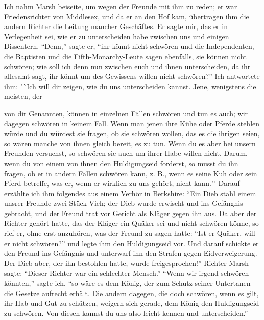 Ich nahm Marsh beiseite, um wegen der Freunde mit ihm
zu reden; er war Friedensrichter von Middlesex, und da er an den
Hof kam, übertragen ihm die andern Richter die Leitung mancher
Geschäftes. Er sagte mir, das er in Verlegenheit sei, wie er zu
unterscheiden habe zwischen uns und einigen Dissentern. "`Denn,"'
sagte er, "`ihr könnt nicht schwören und die Independenten, die
Baptisten und die Fifth-Monarchy-Leute sagen ebenfalls, sie können
nicht schwören; wie soll ich denn nun zwischen euch und ihnen 
unterscheiden, da ihr allesamt sagt, ihr könnt um des Gewissens willen
nicht schwören?"' 
Ich antwortete ihm: "`Ich will dir zeigen, wie
du uns unterscheiden kannst. Jene, wenigstens die meisten, der

von dir Genannten, können in einzelnen Fällen schwören und tun
es auch; wir dagegen schwören in keinem Fall. Wenn man jenen
ihre Kühe oder Pferde stehlen würde und du würdest sie fragen,
ob sie schwören wollen, das es die ihrigen seien, so wären manche
von ihnen gleich bereit, es zu tun. Wenn du es aber bei unsern
Freunden versuchst, so schwören sie auch um ihrer Habe willen
nicht. Darum, wenn du von einem von ihnen den Huldigungseid
forderst, so musst du ihn fragen, ob er in andern Fällen schwören
kann, z. B., wenn es seine Kuh oder sein Pferd betreffe, was er,
wenn er wirklich zu uns gehört, nicht kann."' Darauf erzählte
ich ihm folgendes aus einem Verhör in Berkshire: 
"`Ein Dieb stahl einem unsrer Freunde zwei Stück Vieh; der Dieb wurde erwischt
und ins Gefängnis gebracht, und der Freund trat vor Gericht
als Kläger gegen ihn aus. Da aber der Richter gehört hatte,
das der Kläger ein Quäker sei und nicht schwören könne, so rief
er, ohne erst anzuhören, was der Freund zu sagen hatte: "`Ist
er Quäker, will er nicht schwören?"' und legte ihm den Huldigungseid 
vor. Und darauf schickte er den Freund ins Gefängnis und unterwarf 
ihn den Strafen gegen Eidverweigerung. Der Dieb aber, der
ihn bestohlen hatte, wurde freigesprochen!"' Richter Marsh sagte:
"`Dieser Richter war ein schlechter Mensch."' "`Wenn wir irgend
schwören könnten,"' sagte ich, "`so wäre es dem König, der zum
Schutz seiner Untertanen die Gesetze aufrecht erhält. Die andern
dagegen, die doch schwören, wenn es gilt, ihr Hab und Gut zu
schützen, weigern sich gerade, dem König den Huldigungseid zu
schwören. Von diesen kannst du uns also leicht kennen und unterscheiden."'

